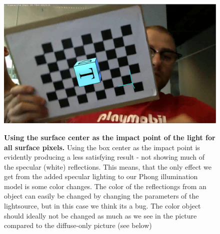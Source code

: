 \begin{figure}[!htbp]
    \includegraphics{pics/boxCenterLightVector.png}
    \label{fig:BoxCenter}
    \caption{\textbf{Using the surface center as the impact point of the light for all surface pixels.} Using the box center as the impact point is evidently producing a less satisfying result - not showing much of the specular (white) reflections. This means, that the only effect we get from the added specular lighting to our Phong illumination model is some color changes. The color of the reflectiongs from an object can easily be changed by changing the parameters of the lightsource, but in this case we think its a bug. The color object should ideally not be changed as much as we see in the picture compared to the diffuse-only picture (see below)}
\end{figure}



